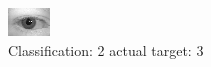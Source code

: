 \begin{figure}[h!]
\begin{center}
\includegraphics[width=0.60\columnwidth]{figures/ID584_class_2_target_3.png}
\end{center}
\caption{ Classification: 2 actual target: 3}
\label{fig:ID584_class_2_target_3}
\end{figure}
